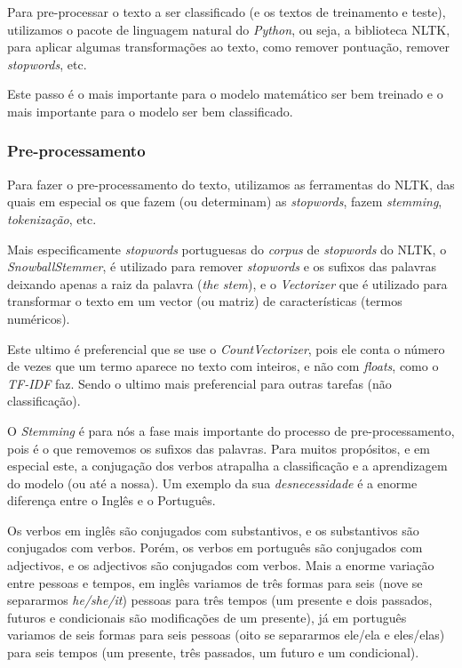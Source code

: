 Para pre-processar o texto a ser classificado (e os textos de treinamento e teste), utilizamos o pacote de linguagem natural do \textit{Python}, ou seja, a biblioteca NLTK, para aplicar algumas transformações ao texto, como remover pontuação, remover \textit{stopwords}, etc.

Este passo é o mais importante para o modelo matemático ser bem treinado e o mais importante para o modelo ser bem classificado.

\subsubsection{Pre-processamento}

Para fazer o pre-processamento do texto, utilizamos as ferramentas do NLTK, das quais em especial os que fazem (ou determinam) as \textit{stopwords}, fazem \textit{stemming}, \textit{tokenização}, etc.

Mais especificamente \textit{stopwords} portuguesas do \textit{corpus} de \textit{stopwords} do NLTK, o \textit{SnowballStemmer}, é utilizado para remover \textit{stopwords} e os sufixos das palavras deixando apenas a raiz da palavra (\textit{the stem}), e o \textit{Vectorizer} que é utilizado para transformar o texto em um vector (ou matriz) de características (termos numéricos).

Este ultimo é preferencial que se use o \textit{CountVectorizer}, pois ele conta o número de vezes que um termo aparece no texto com inteiros, e não com \textit{floats}, como o \textit{TF-IDF} faz. Sendo o ultimo mais preferencial para outras tarefas (não classificação).

O \textit{Stemming} é para nós a fase mais importante do processo de pre-processamento, pois é o que removemos os sufixos das palavras.
Para muitos propósitos, e em especial este, a conjugação dos verbos atrapalha a classificação e a aprendizagem do modelo (ou até a nossa). Um exemplo da sua \textit{desnecessidade} é a enorme diferença entre o Inglês e o Português.

Os verbos em inglês são conjugados com substantivos, e os substantivos são conjugados com verbos. Porém, os verbos em português são conjugados com adjectivos, e os adjectivos são conjugados com verbos. Mais a enorme variação entre pessoas e tempos, em inglês variamos de três formas para seis (nove se separarmos \textit{he/she/it}) pessoas para três tempos (um presente e dois passados, futuros e condicionais são modificações de um presente), já em português variamos de seis formas para seis pessoas (oito se separarmos ele/ela e eles/elas) para seis tempos (um presente, três passados, um futuro e um condicional).

